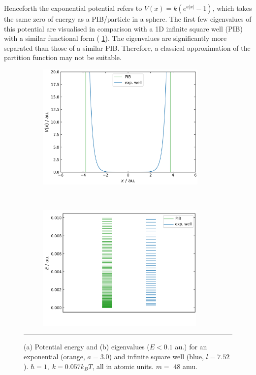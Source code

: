 \documentclass[../main.tex]{subfiles}
\begin{document}
Henceforth the exponential potential refers to $V(x) = k(e^{a|x|} - 1)$, which takes the same zero of energy as a PIB/particle in a sphere. The first few eigenvalues of this potential are visualised in comparison with a 1D infinite square well (PIB) with a similar functional form (\figurename{ \ref{1d_exp_well_pib_potential_eigenvalues}}). The eigenvalues are significantly more separated than those of a similar PIB. Therefore, a classical approximation of the partition function may not be suitable.

\begin{figure}[h!]

	\begin{subfigure}[t]{0.49\textwidth}
		\centering
		\includegraphics[height=6.2cm]{4/figs/1d_exp_well_pib_potential}
		\caption{}
	\end{subfigure}%
	~ 
	\begin{subfigure}[t]{0.49\textwidth}
		\centering
		\includegraphics[height=6.2cm]{4/figs/1d_exp_well_pib_eigenvalues}
		\caption{}
	\end{subfigure}
	\vspace{0.2cm}
	\hrule
	\caption{(a) Potential energy and (b) eigenvalues ($E < 0.1$ au.) for an exponential (orange, $a = 3.0$) and infinite square well (blue, $ l = 7.52$). $\hbar = 1,\; k = 0.057 k_B T$, all in atomic units. $m =$ 48 amu.} 
	\label{1d_exp_well_pib_potential_eigenvalues}
\end{figure}
\end{document}
